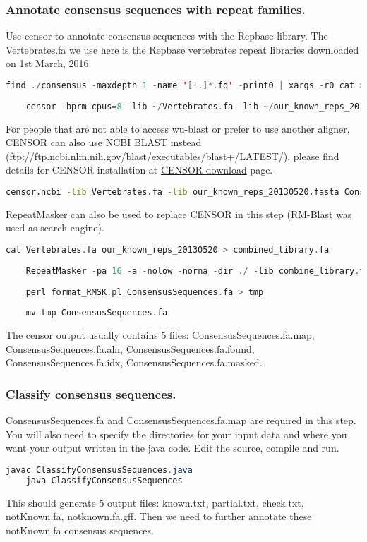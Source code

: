 \documentclass[a4paper,12pt]{article}
\begin{document}
	\subsubsection{Annotate consensus sequences with repeat families.}
	Use censor to annotate consensus sequences with the Repbase library. The Vertebrates.fa we use here is the Repbase vertebrates repeat libraries downloaded on 1st March, 2016. 
	\begin{lstlisting}[language=scala]
	find ./consensus -maxdepth 1 -name '[!.]*.fq' -print0 | xargs -r0 cat > ConsensusSequences.fa
	
	censor -bprm cpus=8 -lib ~/Vertebrates.fa -lib ~/our_known_reps_20130520.fasta ConsensusSequences.fa  \end{lstlisting}
	For people that are not able to access wu-blast or prefer to use another aligner, CENSOR can also use NCBI BLAST instead (ftp://ftp.ncbi.nlm.nih.gov/blast/executables/blast+/LATEST/), please find details for CENSOR installation at \href{http://www.girinst.org/downloads/software/censor/} {\color{blue}CENSOR download} page.
	\begin{lstlisting}[language=bash]
	censor.ncbi -lib Vertebrates.fa -lib our_known_reps_20130520.fasta ConsensusSequences.fa 
	\end{lstlisting}
	RepeatMasker can also be used to replace CENSOR in this step (RM-Blast was used as search engine).	
	\begin{lstlisting}[language=scala]
	cat Vertebrates.fa our_known_reps_20130520 > combined_library.fa
	
	RepeatMasker -pa 16 -a -nolow -norna -dir ./ -lib combine_library.fa ConsensusSequences.fa
	
	perl format_RMSK.pl ConsensusSequences.fa > tmp 
	
	mv tmp ConsensusSequences.fa \end{lstlisting}
	The censor output usually contains 5 files: ConsensusSequences.fa.map, ConsensusSequences.fa.aln, ConsensusSequences.fa.found, ConsensusSequences.fa.idx, ConsensusSequences.fa.masked. 
	
	\subsubsection{Classify consensus sequences.}
	ConsensusSequences.fa and ConsensusSequences.fa.map are required in this step. You will also need to specify the directories for your input data and where you want your output written in the java code. Edit the source, compile and run.\\
	\begin{lstlisting}[language=java]
	javac ClassifyConsensusSequences.java
	java ClassifyConsensusSequences \end{lstlisting}
	This should generate 5 output files: known.txt, partial.txt, check.txt, notKnown.fa, notknown.fa.gff. 
	Then we need to further annotate these notKnown.fa consensus sequences. 
	
\end{document}
